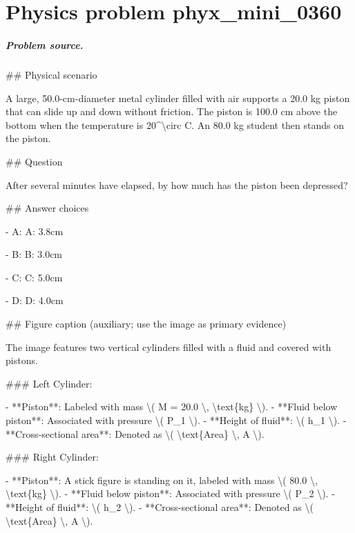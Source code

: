 
\chapter{Physics problem phyx\_mini\_0360}
\label{ch:PhyXMiniProblems_problem_phyx_mini_0360}

\paragraph{Problem source.}
\#\# Physical scenario

A large, 50.0-cm-diameter metal cylinder filled with air supports a 20.0 kg piston that can slide up and down without friction. The piston is 100.0 cm above the bottom when the temperature is 20\textasciicircum{}\textbackslash{}circ C. An 80.0 kg student then stands on the piston.

\#\# Question

After several minutes have elapsed, by how much has the piston been depressed?

\#\# Answer choices

- A: A: 3.8cm

- B: B: 3.0cm

- C: C: 5.0cm

- D: D: 4.0cm

\#\# Figure caption (auxiliary; use the image as primary evidence)

The image features two vertical cylinders filled with a fluid and covered with pistons. 

\#\#\# Left Cylinder:

- **Piston**: Labeled with mass \textbackslash{}( M = 20.0 \textbackslash{}, \textbackslash{}text\{kg\} \textbackslash{}).
- **Fluid below piston**: Associated with pressure \textbackslash{}( P\_1 \textbackslash{}).
- **Height of fluid**: \textbackslash{}( h\_1 \textbackslash{}).
- **Cross-sectional area**: Denoted as \textbackslash{}( \textbackslash{}text\{Area\} \textbackslash{}, A \textbackslash{}).

\#\#\# Right Cylinder:

- **Piston**: A stick figure is standing on it, labeled with mass \textbackslash{}( 80.0 \textbackslash{}, \textbackslash{}text\{kg\} \textbackslash{}).
- **Fluid below piston**: Associated with pressure \textbackslash{}( P\_2 \textbackslash{}).
- **Height of fluid**: \textbackslash{}( h\_2 \textbackslash{}).
- **Cross-sectional area**: Denoted as \textbackslash{}( \textbackslash{}text\{Area\} \textbackslash{}, A \textbackslash{}).

